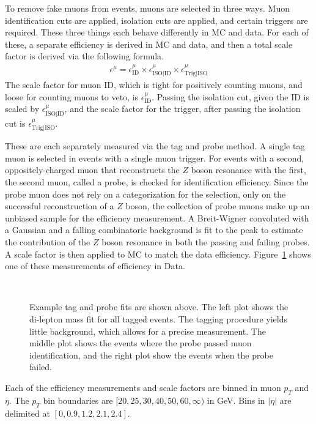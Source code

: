 To remove fake muons from events, muons are selected in three ways.
Muon identification cuts are applied, isolation cuts are applied,
and certain triggers are required.
These three things each behave differently in MC and data.
For each of these, a separate efficiency is derived in MC and data,
and then a total scale factor is derived via the following formula.
\begin{gather}
  \epsilon^\mu = \epsilon^\mu_\mathrm{ID} \times \epsilon^\mu_\mathrm{ISO|ID} \times \epsilon^\mu_\mathrm{Trig|ISO}
\end{gather}
The scale factor for muon ID, which is tight for positively counting muons,
and loose for counting muons to veto, is $\epsilon^\mu_\mathrm{ID}$.
Passing the isolation cut, given the ID is scaled by $\epsilon^\mu_\mathrm{ISO|ID}$,
and the scale factor for the trigger, after passing the isolation cut is
$\epsilon^\mu_\mathrm{Trig|ISO}$.

These are each separately measured via the tag and probe method.
A single tag muon is selected in events with a single muon trigger.
For events with a second, oppositely-charged muon
that reconstructs the $Z$ boson resonance with the first,
the second muon, called a probe, is checked for identification efficiency.
Since the probe muon does not rely on a categorization for the selection,
only on the successful reconstruction of a $Z$ boson,
the collection of probe muons make up an unbiased sample for the efficiency measurement.
A Breit-Wigner convoluted with a Gaussian and a falling combinatoric background
is fit to the peak to estimate the contribution
of the $Z$ boson resonance in both the passing and failing probes.
A scale factor is then applied to MC to match the data efficiency.
Figure~\ref{fig:muon-tag-probe} shows one of these measurements of efficiency in Data.
\begin{figure}
  \centering
  ~
  ~
  \caption[Tag and probe fits]{
    Example tag and probe fits are shown above.
    The left plot shows the di-lepton mass fit for all tagged events.
    The tagging procedure yields little background, which allows for a precise measurement.
    The middle plot shows the events where the probe passed muon identification,
    and the right plot show the events when the probe failed.
    }
  \label{fig:muon-tag-probe}
\end{figure}
Each of the efficiency measurements and scale factors are binned
in muon $p_T$ and $\eta$.
The $p_T$ bin boundaries are $[20, 25, 30, 40, 50, 60, \infty)$ in GeV.
Bins in $|\eta|$ are delimited at $[0, 0.9, 1.2, 2.1, 2.4]$.


